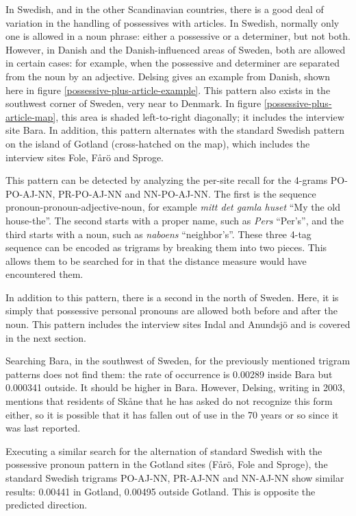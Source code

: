 In Swedish, and in the other Scandinavian countries, there is a good
deal of variation in the handling of possessives with articles. In
Swedish, normally only one is allowed in a noun phrase: either a
possessive or a determiner, but not both. However, in Danish and the
Danish-influenced areas of Sweden, both are allowed in certain cases:
for example, when the possessive and determiner are separated from the
noun by an adjective. Delsing gives an example from Danish, shown here
in figure \ref{possessive-plus-article-example}.  This pattern also
exists in the southwest corner of Sweden, very near to Denmark. In
figure \ref{possessive-plus-article-map}, this area is shaded
left-to-right diagonally; it includes the interview site Bara. In
addition, this pattern alternates with the standard Swedish pattern on
the island of Gotland (cross-hatched on the map), which includes the
interview sites Fole, F\aa{}r\"o and Sproge.

This pattern can be detected by analyzing the per-site recall for the
4-grams PO-PO-AJ-NN, PR-PO-AJ-NN and NN-PO-AJ-NN. The first is the
sequence pronoun-pronoun-adjective-noun, for example {\it mitt det
  gamla huset} ``My the old house-the''. The second starts with a
proper name, such as {\it Pers} ``Per's'', and the third starts with a
noun, such as {\it naboens} ``neighbor's''. These three 4-tag sequence
can be encoded as trigrams by breaking them into two pieces. This
allows them to be searched for in that the distance measure would have
encountered them.

In addition to this pattern, there is a second in the north of
Sweden. Here, it is simply that possessive personal pronouns are
allowed both before and after the noun. This pattern includes the
interview sites Indal and Anundsj\"o and is covered in the next
section.

Searching Bara, in the southwest of Sweden, for the previously
mentioned trigram patterns does not find them: the rate of occurrence
is 0.00289 inside Bara but 0.000341 outside. It should be higher in
Bara. However, Delsing, writing in 2003, mentions that residents of
Sk\aa{}ne that he has asked do not recognize this form either, so it is
possible that it has fallen out of use in the 70 years or so since it
was last reported.

Executing a similar search for the alternation of standard
Swedish with the possessive pronoun pattern in the Gotland sites (F\aa{}r\"o,
Fole and Sproge), the standard Swedish trigrams PO-AJ-NN, PR-AJ-NN and
NN-AJ-NN show similar results: 0.00441 in Gotland, 0.00495 outside
Gotland. This is opposite the predicted direction.

